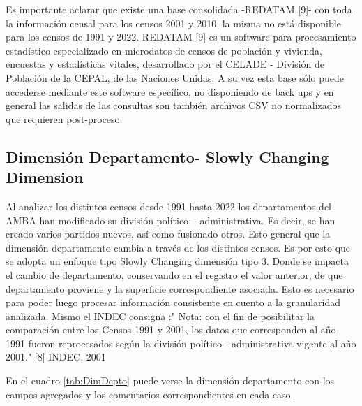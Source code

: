 \documentclass{article}
\theoremstyle{mytheoremstyle}
\theoremstyle{mytheoremstyle}
\theoremstyle{myproblemstyle}
\begin{document}
 Es importante aclarar que existe una base consolidada -REDATAM [9]- con toda la información censal para los censos 2001 y 2010, la misma no está disponible para los censos de 1991 y 2022. REDATAM [9] es un software para procesamiento estadístico especializado en microdatos de censos de población y vivienda, encuestas y estadísticas vitales, desarrollado por el CELADE  -  División de Población de la CEPAL, de las Naciones Unidas.  A su vez esta base sólo puede accederse mediante este software específico, no disponiendo de back ups y en general las salidas de las consultas son también archivos CSV no normalizados que requieren post-proceso.
 \subsection{Dimensión Departamento- Slowly Changing Dimension }
 Al analizar los distintos censos desde 1991 hasta 2022 los departamentos del AMBA han modificado su división político – administrativa. Es decir, se han creado varios partidos nuevos, así como fusionado otros. Esto general que la dimensión departamento cambia a través de los distintos censos. Es por esto que se adopta un enfoque tipo Slowly Changing dimensión tipo 3. Donde se impacta el cambio de departamento, conservando en el registro el valor anterior, de que departamento proviene y la superficie correspondiente asociada. Esto es necesario para poder luego procesar información consistente en cuento a la granularidad analizada. 
 Mismo el INDEC consigna :" Nota: con el fin de posibilitar la comparación entre los Censos 1991 y 2001, los datos que 
 corresponden al año 1991 fueron reprocesados según la división político - administrativa
 vigente al año 2001." [8] INDEC, 2001
 
 En el cuadro \ref{tab:DimDepto} puede verse la dimensión departamento con los campos agregados y
  los comentarios correspondientes en cada caso.
 
\end{document}
